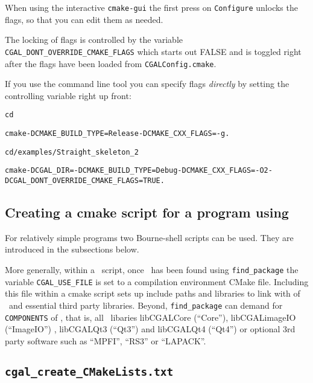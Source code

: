 When using the interactive \texttt{cmake-gui} the first press on \texttt{Configure} unlocks
the flags, so that you can edit them as needed. 

\begin{ccAdvanced}
The locking of flags is controlled by the variable {\tt CGAL\_DONT\_OVERRIDE\_CMAKE\_FLAGS}
which starts out FALSE and is toggled right after the flags have been loaded from
\texttt{CGALConfig.cmake}.

If you use the command line tool you can specify flags {\em directly} by setting the
controlling variable right up front:

{\ccTexHtml{\scriptsize}{}
\begin{alltt}

cd \cgalrel

cmake -DCMAKE_BUILD_TYPE=Release -DCMAKE_CXX_FLAGS=-g .

cd \cgalrel/examples/Straight_skeleton_2

cmake -DCGAL_DIR=\cgalrel -DCMAKE_BUILD_TYPE=Debug -DCMAKE_CXX_FLAGS=-O2 -DCGAL_DONT_OVERRIDE_CMAKE_FLAGS=TRUE . 

\end{alltt}
}
\end{ccAdvanced}


\subsection{Creating a cmake script for a program using \cgal}

For relatively simple programs two Bourne-shell scripts can be
used. They are introduced in the subsections below.

More generally, within a \cmake\ script, once \cgal\ has been found using \texttt{find\_package}
the variable \texttt{CGAL\_USE\_FILE} is set to a compilation environment CMake file. Including
this file within a cmake script sets up include paths and libraries to
link with of \cgal\ and essential third party libraries. Beyond,
\texttt{find\_package} can demand for \texttt{COMPONENTS} of \cgal,
that is, all \cgal\ libaries libCGALCore (``Core''),
libCGALimageIO (``ImageIO'') , libCGALQt3 (``Qt3'') and libCGALQt4
(``Qt4'') or optional 3rd party software such as ``MPFI'', ``RS3'' or
``LAPACK''. 

\subsection{\texttt{cgal\_create\_CMakeLists.txt\label{sec:create_cgal_CMakeLists.txt}}}

